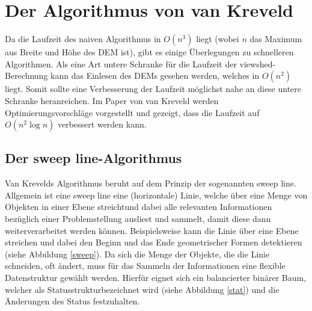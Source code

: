 \section{Der Algorithmus von van Kreveld}

Da die Laufzeit des naiven Algorithmus in $O(n^3)$ liegt (wobei $n$ das Maximum aus Breite und Höhe des DEM ist), gibt es einige Überlegungen zu 
schnelleren Algorithmen. Als eine Art untere Schranke für die Laufzeit der viewshed-Berechnung kann das Einlesen des DEMs gesehen werden, welches 
in $O(n^2)$ liegt. Somit sollte eine Verbesserung der Laufzeit möglichst nahe an diese untere Schranke heranreichen. Im Paper von van Kreveld 
\cite{vanKrev} werden Optimierungsvorschläge vorgestellt und gezeigt, dass die Laufzeit auf $O(n^2\log n)$ verbessert werden kann. 

\subsection{Der sweep line-Algorithmus}
Van Krevelds Algorithmus beruht auf dem Prinzip der sogenannten \glqq sweep line\grqq. Allgemein ist eine sweep line eine (horizontale) Linie, 
welche über eine Menge von Objekten in einer Ebene \glqq streicht\grqq und dabei alle relevanten Informationen bezüglich einer Problemstellung ausliest und 
sammelt, damit diese dann weiterverarbeitet werden können. Beispielsweise kann die Linie über eine Ebene streichen und dabei den Beginn und das Ende 
geometrischer Formen detektieren (siehe Abbildung \ref{sweep}). Da sich die Menge der Objekte, die die Linie schneiden, oft ändert, muss für das 
Sammeln der Informationen eine flexible Datenstruktur gewählt werden. Hierfür eignet sich ein balancierter binärer Baum, welcher als 
\glqq Statusstruktur\grqq bezeichnet wird (siehe Abbildung \ref{stat}) und die Änderungen des Status festzuhalten. 

